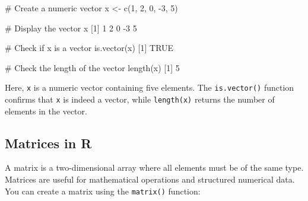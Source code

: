 \documentclass[
  11pt,
]{book}
\makeatletter
\newenvironment{Shaded}{}{}
\newcommand{\CommentTok}[1]{\textcolor[rgb]{0.36,0.36,0.36}{#1}}
\newcommand{\ConstantTok}[1]{#1}
\newcommand{\DecValTok}[1]{#1}
\newcommand{\FunctionTok}[1]{#1}
\newcommand{\NormalTok}[1]{#1}
\newcommand{\OtherTok}[1]{\textcolor[rgb]{0.39,0.39,0.39}{#1}}
\newcommand{\SpecialCharTok}[1]{\textcolor[rgb]{0.39,0.39,0.39}{#1}}
\newenvironment{kframe}{%
\medskip{}
\setlength{\fboxsep}{.8em}
 \def\at@end@of@kframe{}%
 \ifinner\ifhmode%
  \def\at@end@of@kframe{\end{minipage}}%
  \begin{minipage}{\columnwidth}%
 \fi\fi%
 \def\FrameCommand##1{\hskip\@totalleftmargin \hskip-\fboxsep
 \colorbox{shadecolor}{##1}\hskip-\fboxsep
     \hskip-\linewidth \hskip-\@totalleftmargin \hskip\columnwidth}%
 \MakeFramed {\advance\hsize-\width
   \@totalleftmargin\z@ \linewidth\hsize
   \@setminipage}}%
 {\par\unskip\endMakeFramed%
 \at@end@of@kframe}
\renewenvironment{Shaded}{\begin{kframe}}{\end{kframe}}
\theoremstyle{definition}
\theoremstyle{definition}
\theoremstyle{definition}
\theoremstyle{definition}
\theoremstyle{remark}
\makeatother
\begin{document}
\begin{Shaded}
\begin{Highlighting}[]
\CommentTok{\# Create a numeric vector}
\NormalTok{x }\OtherTok{\textless{}{-}} \FunctionTok{c}\NormalTok{(}\DecValTok{1}\NormalTok{, }\DecValTok{2}\NormalTok{, }\DecValTok{0}\NormalTok{, }\SpecialCharTok{{-}}\DecValTok{3}\NormalTok{, }\DecValTok{5}\NormalTok{)}

\CommentTok{\# Display the vector}
\NormalTok{x}
\NormalTok{   [}\DecValTok{1}\NormalTok{]  }\DecValTok{1}  \DecValTok{2}  \DecValTok{0} \SpecialCharTok{{-}}\DecValTok{3}  \DecValTok{5}

\CommentTok{\# Check if x is a vector}
\FunctionTok{is.vector}\NormalTok{(x)}
\NormalTok{   [}\DecValTok{1}\NormalTok{] }\ConstantTok{TRUE}

\CommentTok{\# Check the length of the vector}
\FunctionTok{length}\NormalTok{(x)}
\NormalTok{   [}\DecValTok{1}\NormalTok{] }\DecValTok{5}
\end{Highlighting}
\end{Shaded}

Here, \texttt{x} is a numeric vector containing five elements. The \texttt{is.vector()} function confirms that \texttt{x} is indeed a vector, while \texttt{length(x)} returns the number of elements in the vector.

\subsection*{Matrices in R}\label{matrices-in-r}


A matrix is a two-dimensional array where all elements must be of the same type. Matrices are useful for mathematical operations and structured numerical data. You can create a matrix using the \texttt{matrix()} function:
\end{document}
